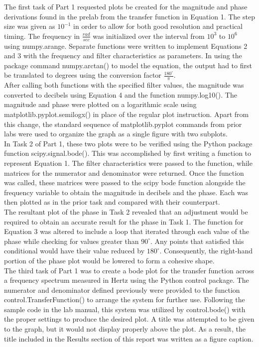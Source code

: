 \documentclass[12pt]{report}
\begin{document}
The first task of Part 1 requested plots be created for the magnitude and phase derivations found in the prelab from the transfer function in Equation 1. The step size was given as $ 10^{-1} $ in order to allow for both good resolution and practical timing. The frequency in $ \frac{rad}{sec} $ was initialized over the interval from $ 10^3 $ to $ 10^6 $ using numpy.arange. Separate functions were written to implement Equations 2 and 3 with the frequency and filter characteristics as parameters. In using the package command numpy.arctan() to model the equation, the output had to first be translated to degrees using the conversion factor $ \frac{180^\circ}{\pi} $. \\

After calling both functions with the specified filter values, the magnitude was converted to decibels using Equation 4 and the function numpy.log10(). The magnitude and phase were plotted on a logarithmic scale using matplotlib.pyplot.semilogx() in place of the regular plot instruction. Apart from this change, the standard sequence of matplotlib.pyplot commands from prior labs were used to organize the graph as a single figure with two subplots. \\ 

In Task 2 of Part 1, these two plots were to be verified using the Python package function scipy.signal.bode(). This was accomplished by first writing a function to represent Equation 1. The filter characteristics were passed to the function, while matrices for the numerator and denominator were returned. Once the function was called, these matrices were passed to the scipy bode function alongside the frequency variable to obtain the magnitude in decibels and the phase. Each was then plotted as in the prior task and compared with their counterpart. \\

The resultant plot of the phase in Task 2 revealed that an adjustment would be required to obtain an accurate result for the phase in Task 1. The function for Equation 3 was altered to include a loop that iterated through each value of the phase while checking for values greater than $ 90^\circ $. Any points that satisfied this conditional would have their value reduced by $ 180^\circ $. Consequently, the right-hand portion of the phase plot would be lowered to form a cohesive shape. \\

The third task of Part 1 was to create a bode plot for the transfer function across a frequency spectrum measured in Hertz using the Python control package. The numerator and denominator defined previously were provided to the function control.TransferFunction() to arrange the system for further use. Following the sample code in the lab manual, this system was utilized by control.bode() with the proper settings to produce the desired plot. A title was attempted to be given to the graph, but it would not display properly above the plot. As a result, the title included in the Results section of this report was written as a figure caption. \\ 
\end{document}
